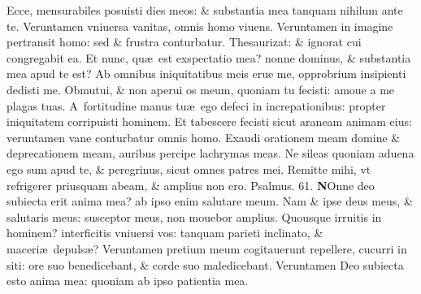 \documentclass[a5paper,10pt]{book}
\def\ae{æ}
\begin{document}
\begin{multicols*}{2}
\newline \color{red} E\color{black}cce, mensurabiles posuisti dies meos: \& substantia mea tanquam nihilum ante te.
\newline \color{red} V\color{black}eruntamen vniuersa vanitas, omnis homo viuens.
\newline \color{red} V\color{black}eruntamen in imagine pertransit homo: sed \& frustra conturbatur.
\newline \color{red} T\color{black}hesaurizat: \& ignorat cui congregabit ea.
\newline \color{red} E\color{black}t nunc, qu\ae \ est exspectatio mea? nonne dominus, \& substantia mea apud te est?
\newline \color{red} A\color{black}b omnibus iniquitatibus meis erue me, opprobrium insipienti dedisti me.
\newline \color{red} O\color{black}bmutui, \& non aperui os meum, quoniam tu fecisti: amoue a me plagas tuas.
\newline \color{red} A\color{black}\ fortitudine manus tu\ae \ ego defeci in increpationibus: propter iniquitatem corripuisti hominem.
\newline \color{red} E\color{black}t tabescere fecisti sicut araneam animam eius: veruntamen vane conturbatur omnis homo.
\newline \color{red} E\color{black}xaudi orationem meam domine \& deprecationem meam, auribus percipe lachrymas meas.
\newline \color{red} N\color{black}e sileas quoniam aduena ego sum apud te, \& peregrinus, sicut omnes patres mei.
\newline \color{red} R\color{black}emitte mihi, vt refrigerer priusquam abeam, \& amplius non ero.
\newline \color{red} Psalmus. 61. \color{black}
\vspace{-.5em}
\lettrine[lines=2]{\bfseries \color{red} N}{}Onne deo subiecta erit anima mea? ab ipso enim salutare meum.
\newline \color{red} N\color{black}am \& ipse deus meus, \& salutaris meus: susceptor meus, non mouebor amplius.
\newline \color{red} Q\color{black}uousque irruitis in hominem? interficitis vniuersi vos: tanquam parieti inclinato, \& maceri\ae \ depuls\ae ?
\newline \color{red} V\color{black}eruntamen pretium meum cogitauerunt repellere, cucurri in siti: ore suo benedicebant, \& corde suo maledicebant.
\newline \color{red} V\color{black}eruntamen Deo subiecta esto anima mea: quoniam ab ipso patientia mea.

\end{multicols*}
\end{document}
